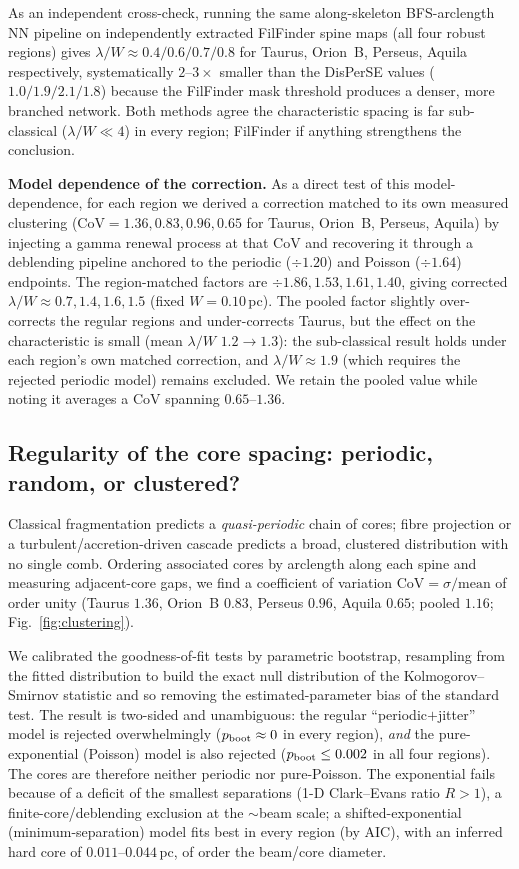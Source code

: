 \documentclass[usenatbib,twoside,twocolumn]{mnras}
\begin{document}
As an independent cross-check, running the same along-skeleton BFS-arclength NN pipeline on independently extracted FilFinder spine maps (all four robust regions) gives $\lambda/W\approx0.4/0.6/0.7/0.8$ for Taurus, Orion~B, Perseus, Aquila respectively, systematically $2$--$3\times$ smaller than the DisPerSE values ($1.0/1.9/2.1/1.8$) because the FilFinder mask threshold produces a denser, more branched network. Both methods agree the characteristic spacing is far sub-classical ($\lambda/W\ll4$) in every region; FilFinder if anything strengthens the conclusion.

\smallskip\noindent\textbf{Model dependence of the correction.}\label{sec:injection_recovery_model}
As a direct test of this model-dependence, for each region we derived a correction matched to its own measured clustering (CoV$=1.36,0.83,0.96,0.65$ for Taurus, Orion~B, Perseus, Aquila) by injecting a gamma renewal process at that CoV and recovering it through a deblending pipeline anchored to the periodic ($\div1.20$) and Poisson ($\div1.64$) endpoints. The region-matched factors are $\div1.86,1.53,1.61,1.40$, giving corrected $\lambda/W\approx0.7,1.4,1.6,1.5$ (fixed $W=0.10$\,pc). The pooled factor slightly over-corrects the regular regions and under-corrects Taurus, but the effect on the characteristic is small (mean $\lambda/W$ $1.2\to1.3$): the sub-classical result holds under each region's own matched correction, and $\lambda/W\approx1.9$ (which requires the rejected periodic model) remains excluded. We retain the pooled value while noting it averages a CoV spanning $0.65$--$1.36$.

\subsection{Regularity of the core spacing: periodic, random, or clustered?}
\label{sec:clustering}
Classical fragmentation predicts a \emph{quasi-periodic} chain of cores; fibre projection or a turbulent/accretion-driven cascade predicts a broad, clustered distribution with no single comb. Ordering associated cores by arclength along each spine and measuring adjacent-core gaps, we find a coefficient of variation $\mathrm{CoV}=\sigma/\mathrm{mean}$ of order unity (Taurus $1.36$, Orion~B $0.83$, Perseus $0.96$, Aquila $0.65$; pooled $1.16$; Fig.~\ref{fig:clustering}).

We calibrated the goodness-of-fit tests by parametric bootstrap, resampling from the fitted distribution to build the exact null distribution of the Kolmogorov--Smirnov statistic and so removing the estimated-parameter bias of the standard test. The result is two-sided and unambiguous: the regular ``periodic$+$jitter'' model is rejected overwhelmingly ($p_{\rm boot}\approx0$ in every region), \emph{and} the pure-exponential (Poisson) model is also rejected ($p_{\rm boot}\leq0.002$ in all four regions). The cores are therefore neither periodic nor pure-Poisson. The exponential fails because of a deficit of the smallest separations (1-D Clark--Evans ratio $R>1$), a finite-core/deblending exclusion at the $\sim$beam scale; a shifted-exponential (minimum-separation) model fits best in every region (by AIC), with an inferred hard core of $0.011$--$0.044$\,pc, of order the beam/core diameter.
\end{document}
